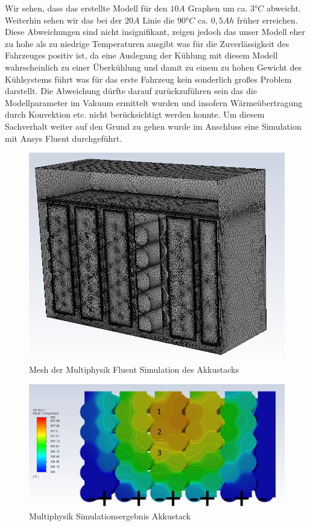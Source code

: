 Wir sehen, dass das erstellte Modell für den \ensuremath{10 A} Graphen um ca. \ensuremath{3°C} abweicht. Weiterhin sehen wir das bei der \ensuremath{20 A} Linie die \ensuremath{90°C} ca. \ensuremath{0,5 Ah} früher erreichen. Diese Abweichungen sind nicht insignifikant, zeigen jedoch das unser Modell eher zu hohe als zu niedrige Temperaturen ausgibt was für die Zuverlässigkeit des Fahrzeuges positiv ist, da eine Auslegung der Kühlung mit diesem Modell wahrscheinlich zu einer Überkühlung und damit zu einem zu hohen Gewicht des Kühlsystems führt was für das erste Fahrzeug kein sonderlich großes Problem darstellt. Die Abweichung dürfte darauf zurückzuführen sein das die Modellparameter im Vakuum ermittelt wurden und insofern Wärmeübertragung durch Konvektion etc. nicht berücksichtigt werden konnte. Um diesem Sachverhalt weiter auf den Grund zu gehen wurde im Anschluss eine Simulation mit Ansys Fluent durchgeführt.

\begin{figure}[h]
	\centering
	\includegraphics[width=0.7\linewidth]{bilder/Accu_Sim_therm_7_2A_45min_simple_mesh}
	\caption{Mesh der Multiphysik Fluent Simulation des Akkustacks}
	\label{fig:accusimtherm72a45minsimplemesh}
\end{figure}

\begin{figure}[h]
	\centering
	\includegraphics[width=0.7\linewidth]{bilder/Accu_Sim_therm_7_2A_45min_simple}
	\caption{Multiphysik Simulationsergebnis Akkustack}
	\label{fig:accusimtherm72a45minsimple}
\end{figure}

